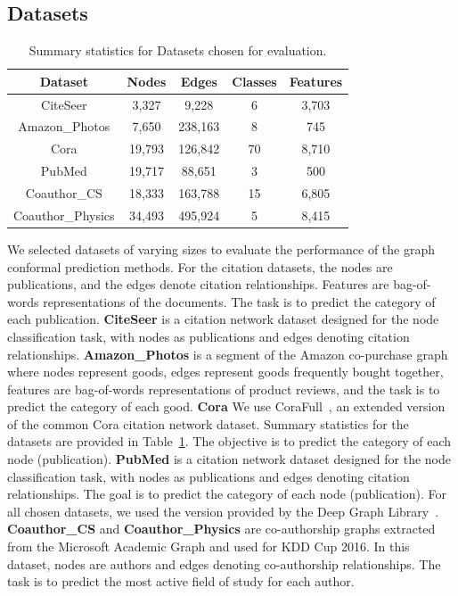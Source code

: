 \subsection{Datasets}

\begin{table}
    \centering
    \begin{tabular}{ccccc}
        \toprule
        Dataset & Nodes & Edges & Classes & Features \\
        \midrule
        CiteSeer & 3,327 & 9,228 & 6 & 3,703 \\ 
        Amazon\_Photos & 7,650 & 238,163 & 8 & 745 \\
        Cora & 19,793 & 126,842 & 70 & 8,710 \\
        PubMed & 19,717 & 88,651 & 3 & 500 \\
        Coauthor\_CS &  18,333 & 163,788 & 15 & 6,805 \\
        Coauthor\_Physics & 34,493 & 495,924 & 5 & 8,415 \\
        \bottomrule
    \end{tabular}
    \caption{Summary statistics for Datasets chosen for evaluation.}
    \label{tab:conformal:datasets}
\end{table}


We selected datasets of varying sizes to evaluate the performance of the graph conformal prediction methods.
For the citation datasets, the nodes are publications, and the edges denote citation relationships.
Features are bag-of-words representations of the documents.
The task is to predict the category of each publication.
\textbf{CiteSeer} is a citation network dataset designed for the node classification task, with nodes as publications and edges denoting citation relationships.
\textbf{Amazon\_Photos} is a segment of the Amazon co-purchase graph~\cite{mcauley2015image} where nodes represent goods, edges represent goods frequently bought together, features are bag-of-words representations of product reviews, and the task is to predict the category of each good.
\textbf{Cora} We use CoraFull~\cite{shchur2018pitfalls}, an extended version of the common Cora citation network dataset.
Summary statistics for the datasets are provided in Table~\ref{tab:conformal:datasets}.
The objective is to predict the category of each node (publication).
\textbf{PubMed} is a citation network dataset designed for the node classification task, with nodes as publications and edges denoting citation relationships. The goal is to predict the category of each node (publication).
For all chosen datasets, we used the version provided by the Deep Graph Library~\cite{wang2019dgl}.
\textbf{Coauthor\_CS} and \textbf{Coauthor\_Physics} are co-authorship graphs extracted from the Microsoft Academic Graph and used for KDD Cup 2016. In this dataset, nodes are authors and edges denoting co-authorship relationships. The task is to predict the most active field of study for each author.

